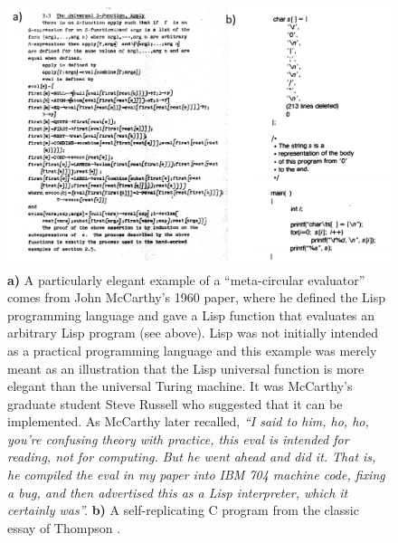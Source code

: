 \begin{figure}
\centering
\includegraphics[width=\textwidth, height=0.25\paperheight, keepaspectratio]{../figure/lispandselfreplicatingprograms.png}
\caption{\textbf{a)} A particularly elegant example of a ``meta-circular
evaluator'' comes from John McCarthy's 1960 paper, where he defined the
Lisp programming language and gave a Lisp function that evaluates an
arbitrary Lisp program (see above). Lisp was not initially intended as a
practical programming language and this example was merely meant as an
illustration that the Lisp universal function is more elegant than the
universal Turing machine. It was McCarthy's graduate student Steve
Russell who suggested that it can be implemented. As McCarthy later
recalled, \emph{``I said to him, ho, ho, you're confusing theory with
practice, this eval is intended for reading, not for computing. But he
went ahead and did it. That is, he compiled the eval in my paper into
IBM 704 machine code, fixing a bug, and then advertised this as a Lisp
interpreter, which it certainly was''.} \textbf{b)} A self-replicating C
program from the classic essay of Thompson
\cite{thompson1984reflections}.}
\label{lispinterpreterfig}
\end{figure}

